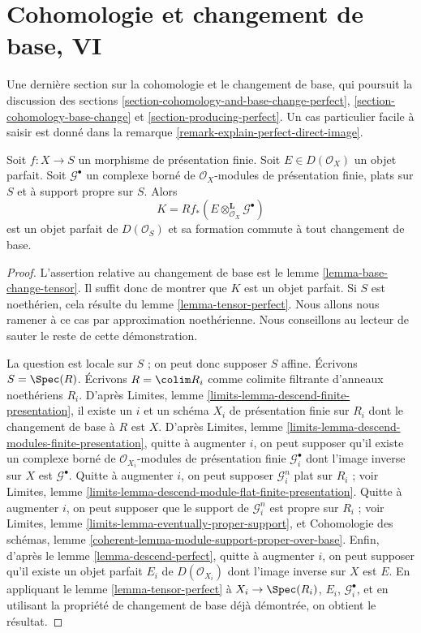 \section{Cohomologie et changement de base, VI}
\label{section-cohomology-and-base-change-final}

\noindent
Une dernière section sur la cohomologie et le changement de base, qui poursuit
la discussion des sections
\ref{section-cohomology-and-base-change-perfect},
\ref{section-cohomology-base-change} et
\ref{section-producing-perfect}.
Un cas particulier facile à saisir est donné dans la
remarque \ref{remark-explain-perfect-direct-image}.

\begin{lemma}
\label{lemma-base-change-tensor-perfect}
Soit $f : X \to S$ un morphisme de présentation finie.
Soit $E \in D(\mathcal{O}_X)$ un objet parfait. Soit $\mathcal{G}^\bullet$
un complexe borné de $\mathcal{O}_X$-modules de présentation finie,
plats sur $S$ et à support propre sur $S$. Alors
$$
K = Rf_*(E \otimes_{\mathcal{O}_X}^\mathbf{L} \mathcal{G}^\bullet)
$$
est un objet parfait de $D(\mathcal{O}_S)$ et sa formation
commute à tout changement de base.
\end{lemma}

\begin{proof}
L'assertion relative au changement de base est le lemme \ref{lemma-base-change-tensor}.
Il suffit donc de montrer que $K$ est un objet parfait. Si $S$ est
noethérien, cela résulte du
lemme \ref{lemma-tensor-perfect}.
Nous allons nous ramener à ce cas par approximation noethérienne.
Nous conseillons au lecteur de sauter le reste de cette démonstration.

\medskip\noindent
La question est locale sur $S$ ; on peut donc supposer $S$ affine.
Écrivons $S = \Spec(R)$. Écrivons $R = \colim R_i$ comme colimite filtrante
d'anneaux noethériens $R_i$. D'après Limites, lemme
\ref{limits-lemma-descend-finite-presentation},
il existe un $i$ et un schéma $X_i$ de présentation finie sur $R_i$
dont le changement de base à $R$ est $X$. D'après
Limites, lemme \ref{limits-lemma-descend-modules-finite-presentation},
quitte à augmenter $i$, on peut supposer qu'il existe un complexe borné
de $\mathcal{O}_{X_i}$-modules de présentation finie
$\mathcal{G}_i^\bullet$ dont l'image inverse sur $X$ est $\mathcal{G}^\bullet$.
Quitte à augmenter $i$, on peut supposer $\mathcal{G}_i^n$ plat sur $R_i$ ; voir
Limites, lemme \ref{limits-lemma-descend-module-flat-finite-presentation}.
Quitte à augmenter $i$, on peut supposer que le support de $\mathcal{G}_i^n$
est propre sur $R_i$ ; voir
Limites, lemme \ref{limits-lemma-eventually-proper-support},
et Cohomologie des schémas, lemme
\ref{coherent-lemma-module-support-proper-over-base}.
Enfin, d'après le lemme \ref{lemma-descend-perfect},
quitte à augmenter $i$, on peut supposer qu'il existe un objet parfait
$E_i$ de $D(\mathcal{O}_{X_i})$ dont l'image inverse sur
$X$ est $E$. En appliquant le lemme \ref{lemma-tensor-perfect}
à $X_i \to \Spec(R_i)$, $E_i$, $\mathcal{G}_i^\bullet$, et en utilisant la
propriété de changement de base déjà démontrée, on obtient le résultat.
\end{proof}

